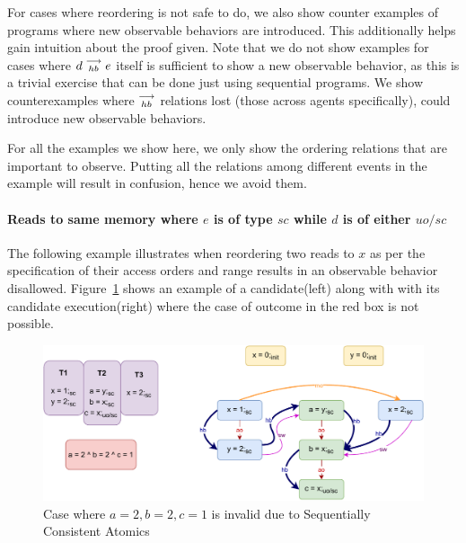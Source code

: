 
    For cases where reordering is not safe to do, we also show counter examples of programs where new observable behaviors are introduced.
    This additionally helps gain intuition about the proof given. 
    Note that we do not show examples for cases where $d\stackrel{\longrightarrow}{_{hb}}e$ itself is sufficient to show a new observable behavior, as this is a trivial exercise that can be done just using sequential programs.
    We show counterexamples where $\stackrel{\longrightarrow}{_{hb}}$ relations lost (those across agents specifically), could introduce new observable behaviors. 

    For all the examples we show here, we only show the ordering relations that are important to observe. 
    Putting all the relations among different events in the example will result in confusion, hence we avoid them. 

    \paragraph{Reads to same memory where $e$ is of type $sc$ while $d$ is of either $uo/sc$}

        The following example illustrates when reordering two reads to $x$ as per the specification of their access orders and range results in an observable behavior disallowed.
        Figure~\ref{reord_counter:example1(a)} shows an example of a candidate(left) along with with its candidate execution(right) where the case of outcome in the red box is not possible. 
        \begin{figure}[H]
            \centering
            \includegraphics[scale=0.7]{4.InstructionReordering/4.ValidReorderingCandidate/Example0(Rsc-Ruo,sc).pdf}
            \caption{Case where $a = 2, b = 2, c = 1$ is invalid due to Sequentially Consistent Atomics}
            \label{reord_counter:example1(a)}
        \end{figure}
        
